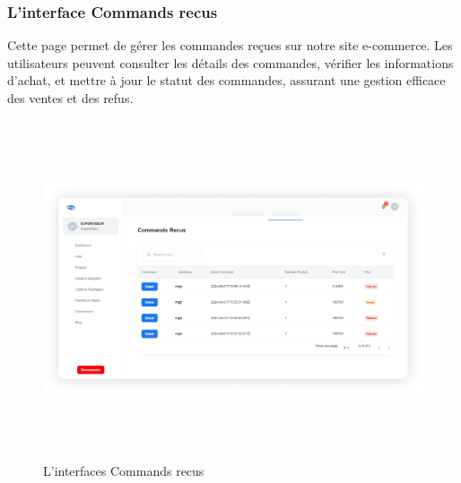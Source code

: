 \documentclass[edit,12pt,a4paper,ChapStyle,oneside,doubleinterligne]{report}
\begin{document}
\subsubsection{L'interface Commands recus}
Cette page permet de gérer les commandes reçues sur notre site e-commerce. Les utilisateurs peuvent consulter les détails des commandes, vérifier les informations d'achat, et mettre à jour le statut des commandes, assurant une gestion efficace des ventes et des refus.
  \begin{figure} [H]
    \centering
    \includegraphics[width = 15.319375cm , height = 10cm , angle=360]{images/commands recus 1.png}
    \caption{L'interfaces Commands recus}
    \label{fig:Commands recus}
\end{figure}
\end{document}
